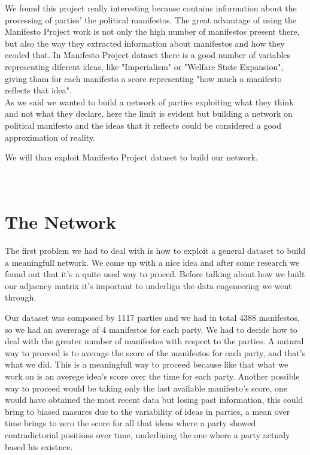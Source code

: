 \documentclass{article}%
\begin{document}
We found this project really interesting because contains information about the processing of parties' the political manifestos. The great advantage of using the Manifesto Project work is not only the high number of manifestos present there, but also 
the way they extracted information about manifestos and how they ecoded that.
In Manifesto Project dataset there is a good number of variables representing diferent ideas, like "Imperialism" or "Welfare State Expansion", giving tham for each manifesto a score representing "how much a manifesto reflects that idea".
\\

As we said we wanted to build a network of parties exploiting what they think and not what they declare, here the limit is evident but building a network on political manifesto and the ideas that it reflects could be considered a good approximation of reality.

We will than exploit Manifesto Project dataset to build our network.
\\
\\
\\


\section{The Network}

The first problem we had to deal with is how to exploit a general dataset to build a meaningfull network. We come up with a nice idea and after some research we found out that it's a quite used way to proced. 
Before talking about how we built our adjacncy matrix it's important to underlign the data engeneering we went through.

Our dataset was composed by 1117 parties and we had in total 4388 manifestos, so we had an avererage of 4 manifestos for each party. We had to decide how to deal with the greater number of manifestos with respect to the parties. A natural way to proceed is to average the score of the manifestos for each party, and that's what we did. This is a meaningfull way to proceed because like that what we work on is an averege idea's score over the time for each party. Another possible way to proceed would be taking only the last available manifesto's score, one would have obtained the most recent data but losing past information, this could bring to biased masures due to the variability of ideas in parties, a mean over time brings to zero the score for all that ideas where a party showed contradictorial positions over time, underlining the one where a party actualy based his existnce.
\\
\end{document}
